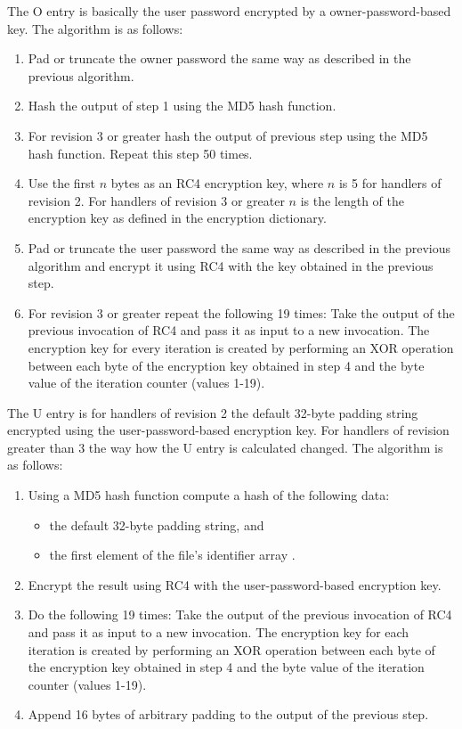 \documentclass[11pt,oneside]{fithesis2}
\begin{document}
The O entry is basically the user password encrypted by a owner-password-based key. The algorithm is as follows:

\begin{enumerate}
\setlength\itemsep{0.1em}
\item{Pad or truncate the owner password the same way as described in the previous algorithm.}
\item{Hash the output of step 1 using the MD5 hash function.}
\item{For revision 3 or greater hash the output of previous step using the MD5 hash function. Repeat this step 50 times.}
\item{Use the first $n$ bytes as an RC4 encryption key, where $n$ is 5 for handlers of revision 2. For handlers of revision 3 or greater $n$ is the length of the encryption key as defined in the encryption dictionary.}
\item{Pad or truncate the user password the same way as described in the previous algorithm and encrypt it using RC4 with the key obtained in the previous step.}
\item{For revision 3 or greater repeat the following 19 times: Take the output of the previous invocation of RC4 and pass it as input to a new invocation. The encryption key for every iteration is created by performing an XOR operation between each byte of the encryption key obtained in step 4 and the byte value of the iteration counter (values 1-19).}
\end{enumerate}

The U entry is for handlers of revision 2 the default 32-byte padding string encrypted using the user-password-based encryption key. For handlers of revision greater than 3 the way how the U entry is calculated changed. The algorithm is as follows:

\begin{enumerate}
\setlength\itemsep{0.1em}
\item{Using a MD5 hash function compute a hash of the following data:}
\begin{itemize}
		\item{the default 32-byte padding string, and}
		\item{the first element of the file's identifier array \cite[p. 43]{pdf_spec}.}
\end{itemize}
\item{Encrypt the result using RC4 with the user-password-based encryption key.}
\item{Do the following 19 times: Take the output of the previous invocation of RC4 and pass it as input to a new invocation. The encryption key for each iteration is created by performing an XOR operation between each byte of the encryption key obtained in step 4 and the byte value of the iteration counter (values 1-19).}
\item{Append 16 bytes of arbitrary padding to the output of the previous step.}
\end{enumerate}
\end{document}
